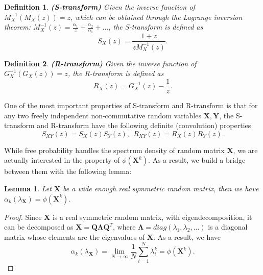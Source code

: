 \documentclass[10pt,journal,compsoc]{IEEEtran}
\newtheorem{lemma}[theorem]{Lemma}
\newtheorem{definition}{Definition}[section]
\begin{document}
\begin{definition}
\textbf{(S-transform)} Given the inverse function of $M^{-1}_X(M_X(z))=z$, which can be obtained through the Lagrange inversion theorem: $M^{-1}_X(z) = \frac{\alpha_1}{z} + \frac{\alpha_2}{\alpha_1}+...$, the S-transform is defined as
\begin{equation}
    S_X(z)=\frac{1+z}{zM_X^{-1}(z)}.
\label{equ:S-transform}
\end{equation}
\label{def:S-transform}
\end{definition}

\begin{definition}
\textbf{(R-transform)} Given the inverse function of $G^{-1}_X(G_X(z))=z$, the R-transform is defined as
\begin{equation}
    R_X(z) = G^{-1}_X(z) - \frac{1}{z}.
\label{equ:R-transform}
\end{equation}
\label{def:R-transform}
\end{definition}

One of the most important properties of S-transform and R-transform is that for any two freely independent non-commutative random variables $\mathbf{X,Y}$, the S-transform and R-transform have the following definite (convolution) properties \cite{ling2018spectrum}
\begin{equation}
    S_{XY}(z) = S_X(z)S_Y(z),~~R_{XY}(z) = R_X(z)R_Y(z).
\label{equ:S_R_transformation_property}
\end{equation}

While free probability handles the spectrum density of random matrix $\mathbf{X}$, we are actually interested in the property of $\phi(\mathbf{X}^k)$. As a result, we build a bridge between them with the following lemma:

\begin{lemma}
Let $\mathbf{X}$ be a wide enough real symmetric random matrix, then we have $\alpha_k(\lambda_{\mathbf{X}})=\phi(\mathbf{X}^k)$.
\label{lemma:bridge_eig_phi}
\end{lemma}
\begin{proof}
Since $\mathbf{X}$ is a real symmetric random matrix, with eigendecomposition, it can be decomposed as $\mathbf{X}=\mathbf{Q\Lambda Q}^T$, where $\mathbf{\Lambda}=diag(\lambda_1, \lambda_2, ...)$ is a diagonal matrix whose elements are the eigenvalues of $\mathbf{X}$. As a result, we have
\begin{equation}
    \alpha_k(\lambda_{\mathbf{X}}) = \lim_{N\rightarrow \infty}\frac{1}{N}\sum_{i=1}^N\lambda_i^k = \phi(\mathbf{X}^k).
\end{equation}
\end{proof}
\end{document}
